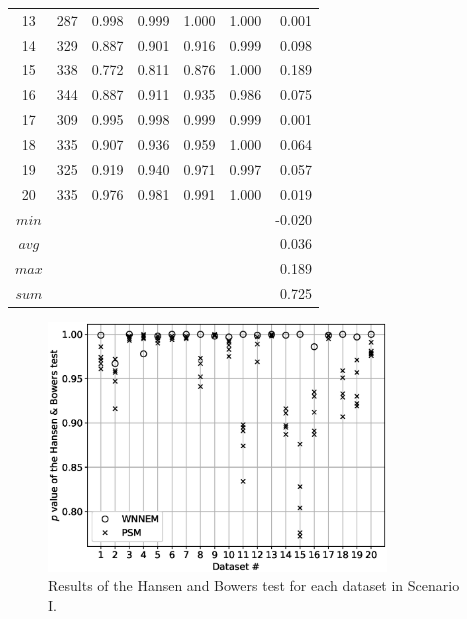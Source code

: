 \begin{table}[h]
\begin{tabular}{ccccccr}
				13      & 287     & 0.998     & 0.999     & 1.000     & 1.000 & 0.001     \\
				14      & 329     & 0.887     & 0.901     & 0.916     & 0.999 & 0.098     \\
				15      & 338     & 0.772     & 0.811     & 0.876     & 1.000 & 0.189     \\
				16      & 344     & 0.887     & 0.911     & 0.935     & 0.986 & 0.075     \\
				17      & 309     & 0.995     & 0.998     & 0.999     & 0.999 & 0.001     \\
				18      & 335     & 0.907     & 0.936     & 0.959     & 1.000 & 0.064     \\
				19      & 325     & 0.919     & 0.940     & 0.971     & 0.997 & 0.057     \\
				20      & 335     & 0.976     & 0.981     & 0.991     & 1.000 & 0.019     \\
				\midrule
				$min$   &         &           &           &           &       & -0.020    \\
				$avg$   &         &           &           &           &       & 0.036     \\
				$max$   &         &           &           &           &       & 0.189     \\
				$sum$   &         &           &           &           &       & 0.725     \\
				\bottomrule
			\end{tabular}
		\end{table}
										
										
		\begin{figure}[h]
			\centering
			\captionsetup{justification=centering}
			\includegraphics[width=0.8\textwidth]{assets/figures/control_group_selection/wnnem/scenI/hbp.eps}
			\caption{Results of the Hansen and Bowers test for each dataset in Scenario I.}
			\label{fig:wnnem_scen_I_hbp}    
		\end{figure}
										

